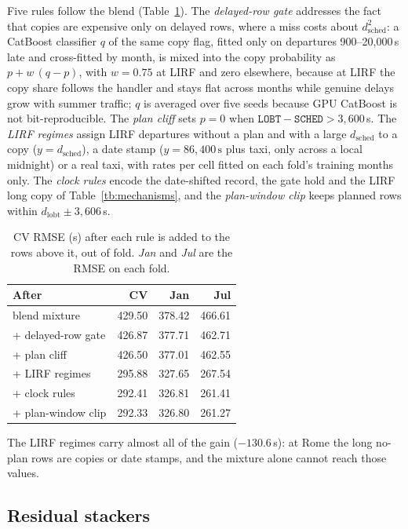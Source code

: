 \documentclass[
  manuscript=article,
  layout=preprint,
  year=2026,
  volume=x,
]{extra/joas}
\newcommand{\fld}[1]{\texttt{#1}}
\begin{document}
Five rules follow the blend (Table~\ref{tb:rules}). The \emph{delayed-row gate} addresses the fact that copies are expensive only on
delayed rows, where a miss costs about $d_{\mathrm{sched}}^2$: a CatBoost classifier $q$ of the same copy flag, fitted only on
departures 900--20,000\,s late and cross-fitted by month, is mixed into the copy probability as $p + w\,(q - p)$, with $w = 0.75$ at LIRF
and zero elsewhere, because at LIRF the copy share follows the handler and stays flat across months while genuine delays grow with
summer traffic; $q$ is averaged over five seeds because GPU CatBoost is not bit-reproducible. The \emph{plan cliff} sets $p = 0$ when
$\fld{LOBT} - \fld{SCHED} > 3{,}600$\,s. The \emph{LIRF regimes} assign LIRF departures without a plan and with a large
$d_{\mathrm{sched}}$ to a copy ($y = d_{\mathrm{sched}}$), a date stamp ($y = 86{,}400\,\mathrm{s}$ plus taxi, only across a local
midnight) or a real taxi, with rates per cell fitted on each fold's training months only. The \emph{clock rules} encode the date-shifted
record, the gate hold and the LIRF long copy of Table~\ref{tb:mechanisms}, and the \emph{plan-window clip} keeps planned rows within
$d_{\mathrm{lobt}} \pm 3{,}606$\,s.

\begin{table}[htbp!]
  \centering
  \small
  \caption{CV RMSE (s) after each rule is added to the rows above it, out of fold. \emph{Jan} and \emph{Jul} are the RMSE on each fold.}
  \label{tb:rules}
  \begin{tabular}{lrrr}
  \toprule
  \textbf{After} & \textbf{CV} & \textbf{Jan} & \textbf{Jul} \\
  \midrule
  blend mixture & 429.50 & 378.42 & 466.61 \\
  + delayed-row gate & 426.87 & 377.71 & 462.71 \\
  + plan cliff & 426.50 & 377.01 & 462.55 \\
  + LIRF regimes & 295.88 & 327.65 & 267.54 \\
  + clock rules & 292.41 & 326.81 & 261.41 \\
  + plan-window clip & 292.33 & 326.80 & 261.27 \\
  \bottomrule
  \end{tabular}
\end{table}

The LIRF regimes carry almost all of the gain ($-130.6$\,s): at Rome the long no-plan rows are copies or date stamps, and the mixture
alone cannot reach those values.

\subsection{Residual stackers}
\label{sec:stackers}
\end{document}
